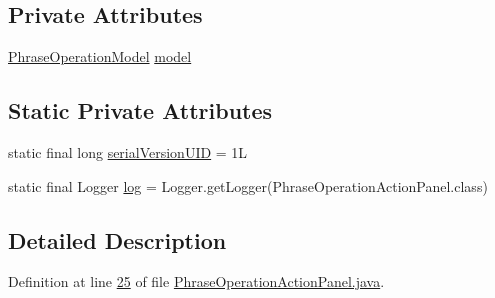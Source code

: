 \subsection*{Private Attributes}
\begin{DoxyCompactItemize}
\item 
\hyperlink{classcom_1_1poly_1_1nlp_1_1filekommander_1_1views_1_1models_1_1_phrase_operation_model}{Phrase\-Operation\-Model} \hyperlink{classcom_1_1poly_1_1nlp_1_1filekommander_1_1views_1_1panels_1_1_phrase_operation_action_panel_ac8380b5cb091933bcb138d4b7471d3c1}{model}
\end{DoxyCompactItemize}
\subsection*{Static Private Attributes}
\begin{DoxyCompactItemize}
\item 
static final long \hyperlink{classcom_1_1poly_1_1nlp_1_1filekommander_1_1views_1_1panels_1_1_phrase_operation_action_panel_a422015c9557a6c51405b4eab27b52452}{serial\-Version\-U\-I\-D} = 1\-L
\item 
static final Logger \hyperlink{classcom_1_1poly_1_1nlp_1_1filekommander_1_1views_1_1panels_1_1_phrase_operation_action_panel_a7f7421f37f3cd27c33006cc3da85ec7a}{log} = Logger.\-get\-Logger(Phrase\-Operation\-Action\-Panel.\-class)
\end{DoxyCompactItemize}


\subsection{Detailed Description}


Definition at line \hyperlink{L25}{25} of file \hyperlink{}{Phrase\-Operation\-Action\-Panel.\-java}.



